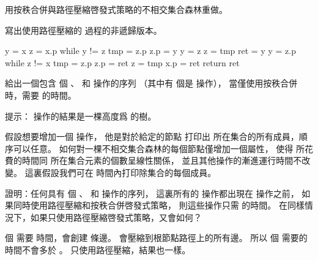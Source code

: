 \startsection[
  title={Disjoint-set forests},
  reference=section:disjoint_set_forests,
]

\startEXERCISE
用按秩合併與路徑壓縮啓發式策略的不相交集合森林重做。
\stopEXERCISE

\startANSWER
{}
\stopANSWER

\startEXERCISE
寫出使用路徑壓縮的  過程的非遞歸版本。
\stopEXERCISE

\startANSWER
{}
\startCLRS
y = x
z = x.p
while y != z
	tmp = z.p
	z.p = y
	y = z
	z = tmp
ret = y
y = z.p
while z != x
	tmp = z.p
	z.p = ret
	z = tmp
x.p = ret
return ret
\stopCLRS
\stopANSWER

\startEXERCISE
給出一個包含  個 、  和  操作的序列
（其中有  個是  操作），
當僅使用按秩合併時，需要  的時間。
\stopEXERCISE

\startANSWER
提示：  操作的結果是一棵高度爲  的樹。
\stopANSWER

\startEXERCISE
假設想要增加一個  操作，
他是對於給定的節點  打印出  所在集合的所有成員，順序可以任意。
如何對一棵不相交集合森林的每個節點僅增加一個屬性，
使得  所花費的時間同  所在集合元素的個數呈線性關係，
並且其他操作的漸進運行時間不改變。
這裏假設我們可在  時間內打印除集合的每個成員。
\stopEXERCISE

\startANSWER
{}
\stopANSWER

\startEXERCISE\DIFFICULT
證明：任何具有  個 、  和  操作的序列，
這裏所有的  操作都出現在  操作之前，
如果同時使用路徑壓縮和按秩合併啓發式策略，
則這些操作只需  的時間。
在同樣情況下，如果只使用路徑壓縮啓發式策略，又會如何？
\stopEXERCISE

\startANSWER
{} 個  需要  時間，會創建  條邊。
  會壓縮到根節點路徑上的所有邊。
所以  個  需要的時間不會多於 。
只使用路徑壓縮，結果也一樣。
\stopANSWER

\stopsection
